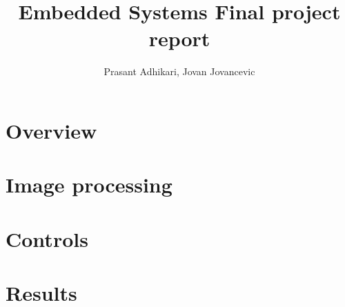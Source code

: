\documentclass[12pt, twoside, a4paper, titlepage]{article}
\begin{document}
\title{Embedded Systems \linebreak Final project report }
\author{Prasant Adhikari, Jovan Jovancevic}
\maketitle

\section{Overview}

\section{Image processing}

\section{Controls}

\section{Results}
\end{document}
